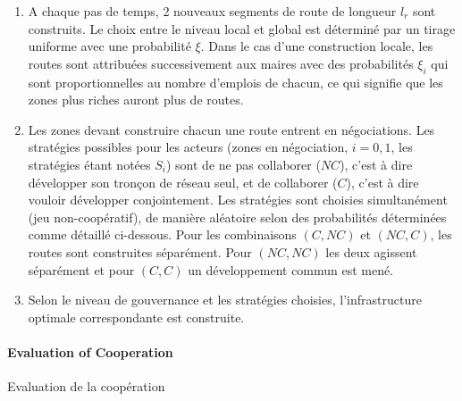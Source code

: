 {\begin{enumerate}
	\item A chaque pas de temps, 2 nouveaux segments de route de longueur $l_r$ sont construits. Le choix entre le niveau local et global est déterminé par un tirage uniforme avec une probabilité $\xi$. Dans le cas d'une construction locale, les routes sont attribuées successivement aux maires avec des probabilités $\xi_i$ qui sont proportionnelles au nombre d'emplois de chacun, ce qui signifie que les zones plus riches auront plus de routes.
	\item Les zones devant construire chacun une route entrent en négociations. Les stratégies possibles pour les acteurs (zones en négociation, $i=0,1$, les stratégies étant notées $S_i$) sont de ne pas collaborer ($NC$), c'est à dire développer son tronçon de réseau seul, et de collaborer ($C$), c'est à dire vouloir développer conjointement. Les stratégies sont choisies simultanément (jeu non-coopératif), de manière aléatoire selon des probabilités déterminées comme détaillé ci-dessous. Pour les combinaisons $(C,NC)$ et $(NC,C)$, les routes sont construites séparément. Pour $(NC,NC)$ les deux agissent séparément et pour $(C,C)$ un développement commun est mené.
	\item Selon le niveau de gouvernance et les stratégies choisies, l'infrastructure optimale correspondante est construite.
\end{enumerate}
}


\paragraph{Evaluation of Cooperation}{Evaluation de la coopération}

